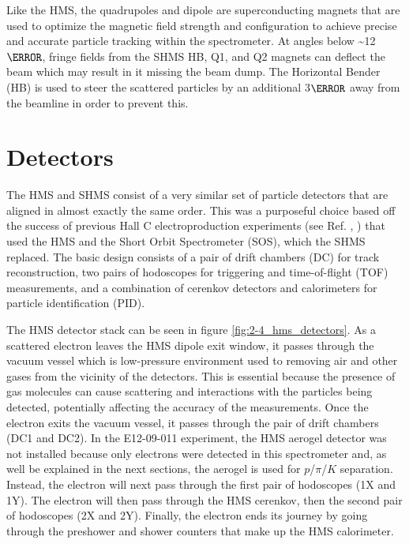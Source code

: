 \documentclass[
]{report}
\begin{document}


Like the HMS, the quadrupoles and dipole are superconducting magnets
that are used to optimize the magnetic field strength and configuration
to achieve precise and accurate particle tracking within the
spectrometer. At angles below \textasciitilde12\(\degree\), fringe
fields from the SHMS HB, Q1, and Q2 magnets can deflect the beam which
may result in it missing the beam dump. The Horizontal Bender (HB) is
used to steer the scattered particles by an additional 3\(\degree\) away
from the beamline in order to prevent this.

\hypertarget{Section-4.6}{%
\section{Detectors}\label{Section-4.6}}

The HMS and SHMS consist of a very similar set of particle detectors
that are aligned in almost exactly the same order. This was a purposeful
choice based off the success of previous Hall C electroproduction
experiments (see Ref. \cite{horn_determination_2006},
\cite{blok_charged_2008}) that used the HMS and the Short Orbit
Spectrometer (SOS), which the SHMS replaced. The basic design consists
of a pair of drift chambers (DC) for track reconstruction, two pairs of
hodoscopes for triggering and time-of-flight (TOF) measurements, and a
combination of cerenkov detectors and calorimeters for particle
identification (PID).



The HMS detector stack can be seen in figure
\ref{fig:2-4_hms_detectors}. As a scattered electron leaves the HMS
dipole exit window, it passes through the vacuum vessel which is
low-pressure environment used to removing air and other gases from the
vicinity of the detectors. This is essential because the presence of gas
molecules can cause scattering and interactions with the particles being
detected, potentially affecting the accuracy of the measurements. Once
the electron exits the vacuum vessel, it passes through the pair of
drift chambers (DC1 and DC2). In the E12-09-011 experiment, the HMS
aerogel detector was not installed because only electrons were detected
in this spectrometer and, as well be explained in the next sections, the
aerogel is used for \(p\)/\(\pi\)/\(K\) separation. Instead, the
electron will next pass through the first pair of hodoscopes (1X and
1Y). The electron will then pass through the HMS cerenkov, then the
second pair of hodoscopes (2X and 2Y). Finally, the electron ends its
journey by going through the preshower and shower counters that make up
the HMS calorimeter.
\end{document}
